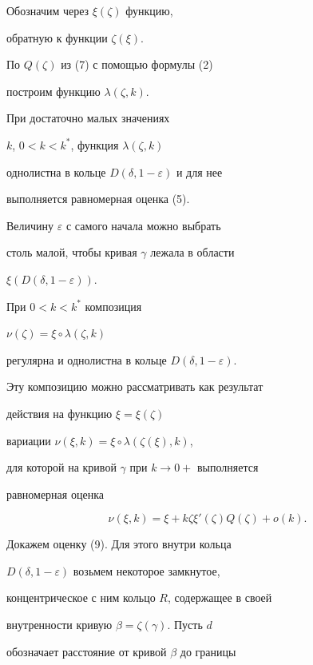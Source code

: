 \begin{pf}


Обозначим через $\xi(\zeta)$ функцию, 


обратную к функции $\zeta(\xi)$.


По $Q(\zeta)$ из (7) с помощью формулы (2)


построим функцию $\lambda(\zeta,k)$.


При достаточно малых значениях 


$k$, $0<k<k^{*}$, функция $\lambda(\zeta,k)$


однолистна в кольце $D(\delta,1-\varepsilon)$ и для нее


выполняется равномерная оценка (5).


Величину $\varepsilon$ с самого начала можно выбрать


столь малой, чтобы кривая $\gamma$ лежала в области


$\xi(D(\delta,1-\varepsilon))$.





При $0<k<k^{*}$ композиция


$\nu(\zeta)=\xi\circ\lambda(\zeta,k)$


регулярна и однолистна в кольце $D(\delta,1-\varepsilon)$.


Эту композицию можно рассматривать как результат


действия на функцию $\xi=\xi(\zeta)$


вариации $\nu(\xi,k)=\xi\circ\lambda(\zeta(\xi),k)$,


для которой на кривой $\gamma$ при $k\to 0+$ выполняется 


равномерная оценка


\begin{equation}


\nu(\xi,k)=\xi+k\zeta \xi'(\zeta)Q(\zeta)+o(k).


\end{equation}





Докажем оценку (9). Для этого внутри кольца 


$D(\delta,1-\varepsilon)$ возьмем некоторое замкнутое,


концентрическое с ним кольцо $R$, содержащее в своей


внутренности кривую $\beta=\zeta(\gamma)$. Пусть $d$ 


обозначает расстояние от кривой $\beta$ до границы  



\end{pf}
